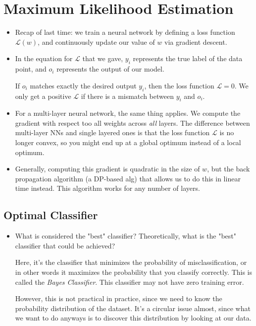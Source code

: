 \section{Maximum Likelihood Estimation}
\begin{itemize}
	\item Recap of last time: we train a neural network by defining a loss function
		\( \mathcal{ L}(w) \), and continuously update our value of \( w \) via
		gradient descent.  
	\item In the equation for \( \mathcal{L} \) that we gave, \( y_i \) represents
		the true label of the data point, and \( o_i \) represents the output of our
		model. 

		If \( o_i \) matches exactly the desired output \( y_i \), then the loss
		function \( \mathcal{L} = 0 \). We only get a positive \( \mathcal{L} \) if
		there is a mismatch between \( y_i \) and \( o_i \).  
	\item For a multi-layer neural network, the same thing applies. We compute the
		gradient with respect too all weights across \textit{all} layers. The
		difference between multi-layer NNs and single layered ones is that the loss
		function \( \mathcal{ L} \) is no longer convex, so you might end up at a
		global optimum instead of a local optimum. 
	\item Generally, computing this gradient is quadratic in the size of \( w \), but
		the back propagation algorithm (a DP-based alg) that allows us to do this in
		linear time instead. This algorithm works for any number of layers.  
\end{itemize}

\subsection{Optimal Classifier}
\begin{itemize}
	\item What is considered the "best" classifier? Theoretically, what is the "best"
		classifier that could be achieved? 

		Here, it's the classifier that minimizes the probability of
		misclassification, or in other words it maximizes the probability that you
		classify correctly. This is called the \textit{Bayes Classifier}. This
		classifier may not have zero training error. 

		However, this is not practical in practice, since we need to know the
		probability distribution of the dataset. It's a circular issue almost, since
		what we want to do anyways is to discover this distribution by looking at our
		data. 
\end{itemize}

